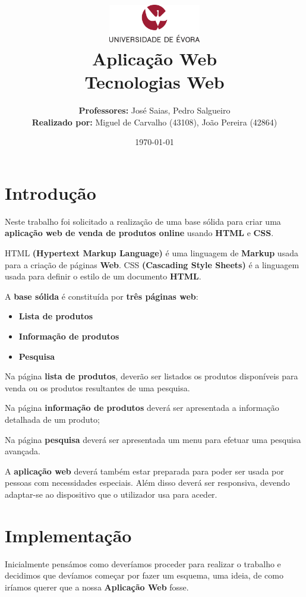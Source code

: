 \documentclass[11pt]{article}   %
\title
{
    \includegraphics[width=0.3\textwidth]{images/logo_universidade.png}
    \\[0.1cm]
    \textbf{Aplicação Web} \\
    Tecnologias Web
}
\author
{
    \textbf{Professores:} José Saias, Pedro Salgueiro \\
    \textbf{Realizado por:} Miguel de Carvalho (43108), João Pereira (42864) 
}
\date{\today}
\begin{document}
\maketitle

\section{Introdução} 

\hspace{0,5cm}Neste trabalho foi solicitado a realização de uma base sólida para criar uma 
\textbf{aplicação web de venda de produtos online} usando \textbf{HTML} e \textbf{CSS}. \par
HTML \textbf{(Hypertext Markup Language)} é uma linguagem de \textbf{Markup} usada para a criação de páginas \textbf{Web}.
CSS \textbf{(Cascading Style Sheets)} é a linguagem usada para definir o estilo de um documento \textbf{HTML}. \par
A \textbf{base sólida} é constituída por \textbf{três páginas web}:
\begin{itemize}
    \item \textbf{Lista de produtos} 
    \item \textbf{Informação de produtos} 
    \item \textbf{Pesquisa} 
\end{itemize}

Na página \textbf{lista de produtos}, deverão ser listados os produtos disponíveis para venda ou os produtos
resultantes de uma pesquisa.

Na página \textbf{informação de produtos} deverá ser apresentada a informação detalhada de um produto;

Na página \textbf{pesquisa} deverá ser apresentada um menu para efetuar uma pesquisa avançada.

A \textbf{aplicação web} deverá também estar preparada para poder ser usada por pessoas com necessidades especiais.
Além disso deverá ser responsiva, devendo adaptar-se ao dispositivo que o utilizador usa para aceder.
\section{Implementação}

\hspace{0,5cm}Inicialmente pensámos como deveríamos proceder para realizar o trabalho e decidimos que
devíamos começar por fazer um esquema, uma ideia, de como iríamos querer que a nossa \textbf{Aplicação Web} fosse.
\end{document}
